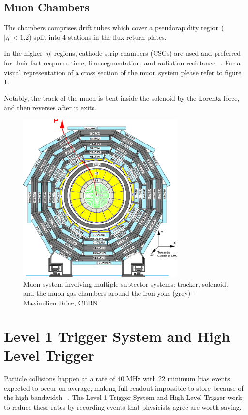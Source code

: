 \subsection{Muon Chambers} 
The chambers comprises drift tubes which cover a pseudorapidity region ($|\eta|<1.2$) split into 4 stations in the flux return plates.

In the higher $|\eta|$ regions, cathode strip chambers (CSCs) are used and preferred for their fast response time, fine segmentation, and radiation resistance ~\cite{Chatrchyan:1129810}. For a visual representation of a cross section of the muon system please refer to figure \ref{fig:muonsystem}. 

Notably, the track of the muon is bent inside the solenoid by the Lorentz force, and then reverses after it exits. 

\begin{figure}[ht!b]
  \centering
\includegraphics[width=0.75\textwidth]{figures/Layout-of-the-CMS-barrel-muon-DT-chambers-in-one-of-the-5-wheels-59.png}    
    \caption{\label{fig:muonsystem} Muon system involving multiple subtector systems: tracker, solenoid, and the muon gas chambers around the iron yoke (grey) - Maximilien Brice, CERN }
\end{figure}


\section{Level 1 Trigger System and High Level Trigger}
Particle collisions happen at a rate of 40 MHz with 22 minimum bias events expected to occur on average, making full readout impossible to store because of the high bandwidth ~\cite{Bruning:782076,Foudas:2232067}. The Level 1 Trigger System and High Level Trigger work to reduce these rates by recording events that physicists agree are worth saving. 

